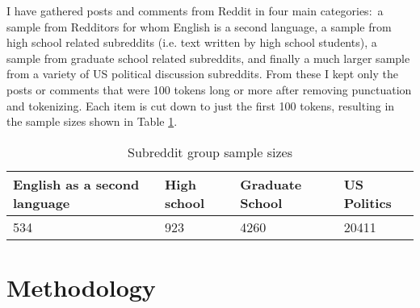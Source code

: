 \documentclass{amsart}
\theoremstyle{definition}
\theoremstyle{plain}
\numberwithin{equation}{section}
\begin{document}
I have gathered posts and comments from Reddit in four main categories:\ a
sample from Redditors for whom English is a second language, a sample from
high school related subreddits (i.e. text written by high school students),
a sample from graduate school related subreddits, and finally a much larger
sample from a variety of US political discussion subreddits. From these I
kept only the posts or comments that were 100 tokens long or more after
removing punctuation and tokenizing. Each item is cut down to just the first
100 tokens, resulting in the sample sizes shown in Table \ref{TableKey}.

\begin{table}[tbp] \centering%
\begin{tabular}{|l|l|l|l|}
\hline
\textbf{English as a second language} & \textbf{High school} & \textbf{%
Graduate School} & \textbf{US Politics} \\ \hline
534 & 923 & 4260 & 20411 \\ \hline
\end{tabular}%
\caption{Subreddit group sample sizes}\label{TableKey}%
\end{table}

\section{Methodology}
\end{document}

